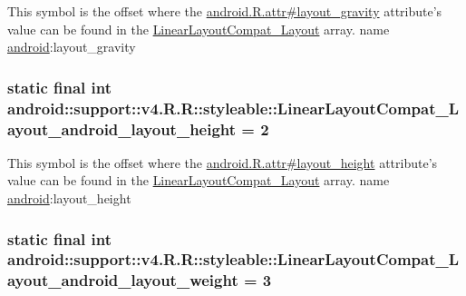 This symbol is the offset where the \hyperlink{}{android.R.attr\#layout\_\-gravity} attribute's value can be found in the \hyperlink{classandroid_1_1support_1_1v4_1_1_r_1_1styleable_a8dc84dfe6c307db75f05c4257866884}{LinearLayoutCompat\_\-Layout} array.  name \hyperlink{namespaceandroid}{android}:layout\_\-gravity \hypertarget{classandroid_1_1support_1_1v4_1_1_r_1_1styleable_eafec718baa0f8681ec6643c6cd2e749}{
\subsubsection[{LinearLayoutCompat\_\-Layout\_\-android\_\-layout\_\-height}]{\setlength{\rightskip}{0pt plus 5cm}static final int android::support::v4.R.R::styleable::LinearLayoutCompat\_\-Layout\_\-android\_\-layout\_\-height = 2}}
\label{classandroid_1_1support_1_1v4_1_1_r_1_1styleable_eafec718baa0f8681ec6643c6cd2e749}


This symbol is the offset where the \hyperlink{}{android.R.attr\#layout\_\-height} attribute's value can be found in the \hyperlink{classandroid_1_1support_1_1v4_1_1_r_1_1styleable_a8dc84dfe6c307db75f05c4257866884}{LinearLayoutCompat\_\-Layout} array.  name \hyperlink{namespaceandroid}{android}:layout\_\-height \hypertarget{classandroid_1_1support_1_1v4_1_1_r_1_1styleable_b4af83ad77725822d082552796d2bfae}{
\subsubsection[{LinearLayoutCompat\_\-Layout\_\-android\_\-layout\_\-weight}]{\setlength{\rightskip}{0pt plus 5cm}static final int android::support::v4.R.R::styleable::LinearLayoutCompat\_\-Layout\_\-android\_\-layout\_\-weight = 3}}
\label{classandroid_1_1support_1_1v4_1_1_r_1_1styleable_b4af83ad77725822d082552796d2bfae}


